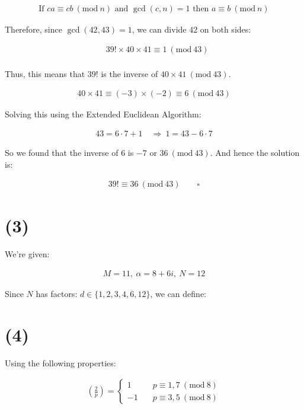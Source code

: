 \documentclass{article}
\newcommand{\modwos}[1]{\ (\mathrm{mod}\ #1)}
\begin{document}
\begin{align*}
    \text{If } ca \equiv cb \modwos{n} \text{ and } \gcd(c, n) = 1 \text{ then } a \equiv b \modwos{n}
\end{align*}

Therefore, since $\gcd(42, 43) = 1$, we can divide $42$ on both sides:

\begin{align*}
    &39! \times 40 \times 41 \equiv 1 \modwos{43} \\
\end{align*}

Thus, this means that $39!$ is the inverse of $40 \times 41 \modwos{43}$.

\begin{align*}
    40 \times 41 \equiv (-3) \times (-2) \equiv 6 \modwos{43}
\end{align*}


Solving this using the Extended Euclidean Algorithm:

\begin{align*}
    43 = 6 \cdot 7 + 1 \quad \Rightarrow \ 1 = 43 - 6 \cdot 7 
\end{align*}

So we found that the inverse of $6$ is $-7$ or $36 \modwos{43}$. And hence the solution is:

\begin{align*}
    39! \equiv 36 \modwos{43} \qquad \square
\end{align*}


\section*{(3)}

We're given:

\begin{align*}
    M = 11, \ \alpha = 8 + 6i, \ N = 12
\end{align*}

Since $N$ has factors: $d \in \{1, 2, 3, 4, 6, 12\}$, we can define:

\section*{(4)}


Using the following properties:

\begin{align*}
    \left(\frac{2}{p}\right) = 
    \begin{cases}
        1 \quad &p \equiv 1, 7 \modwos{8} \\
        -1 \quad &p \equiv 3, 5 \modwos{8}
    \end{cases}\tag{1}
\end{align*}
\end{document}

